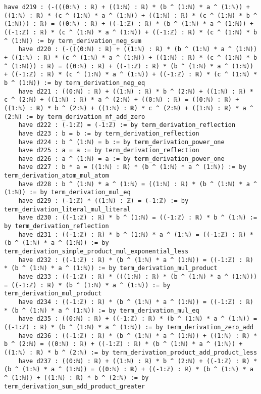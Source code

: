 \documentclass{article}
\begin{document}
\begin{tcolorbox}[colback=white!10, width=\linewidth]
\begin{lstlisting}[language=Lean4]
    have d219 : (-(((0:ℕ) : ℝ) + ((1:ℕ) : ℝ) * (b ^ (1:ℕ) * a ^ (1:ℕ)) + ((1:ℕ) : ℝ) * (c ^ (1:ℕ) * a ^ (1:ℕ)) + ((1:ℕ) : ℝ) * (c ^ (1:ℕ) * b ^ (1:ℕ))) : ℝ) = ((0:ℕ) : ℝ) + ((-1:ℤ) : ℝ) * (b ^ (1:ℕ) * a ^ (1:ℕ)) + ((-1:ℤ) : ℝ) * (c ^ (1:ℕ) * a ^ (1:ℕ)) + ((-1:ℤ) : ℝ) * (c ^ (1:ℕ) * b ^ (1:ℕ)) := by term_derivation_neg_sum
    have d220 : (-(((0:ℕ) : ℝ) + ((1:ℕ) : ℝ) * (b ^ (1:ℕ) * a ^ (1:ℕ)) + ((1:ℕ) : ℝ) * (c ^ (1:ℕ) * a ^ (1:ℕ)) + ((1:ℕ) : ℝ) * (c ^ (1:ℕ) * b ^ (1:ℕ))) : ℝ) = ((0:ℕ) : ℝ) + ((-1:ℤ) : ℝ) * (b ^ (1:ℕ) * a ^ (1:ℕ)) + ((-1:ℤ) : ℝ) * (c ^ (1:ℕ) * a ^ (1:ℕ)) + ((-1:ℤ) : ℝ) * (c ^ (1:ℕ) * b ^ (1:ℕ)) := by term_derivation_neg_eq
    have d221 : ((0:ℕ) : ℝ) + ((1:ℕ) : ℝ) * b ^ (2:ℕ) + ((1:ℕ) : ℝ) * c ^ (2:ℕ) + ((1:ℕ) : ℝ) * a ^ (2:ℕ) + ((0:ℕ) : ℝ) = ((0:ℕ) : ℝ) + ((1:ℕ) : ℝ) * b ^ (2:ℕ) + ((1:ℕ) : ℝ) * c ^ (2:ℕ) + ((1:ℕ) : ℝ) * a ^ (2:ℕ) := by term_derivation_nf_add_zero
    have d222 : (-1:ℤ) = (-1:ℤ) := by term_derivation_reflection
    have d223 : b = b := by term_derivation_reflection
    have d224 : b ^ (1:ℕ) = b := by term_derivation_power_one
    have d225 : a = a := by term_derivation_reflection
    have d226 : a ^ (1:ℕ) = a := by term_derivation_power_one
    have d227 : b * a = ((1:ℕ) : ℝ) * (b ^ (1:ℕ) * a ^ (1:ℕ)) := by term_derivation_atom_mul_atom
    have d228 : b ^ (1:ℕ) * a ^ (1:ℕ) = ((1:ℕ) : ℝ) * (b ^ (1:ℕ) * a ^ (1:ℕ)) := by term_derivation_mul_eq
    have d229 : (-1:ℤ) * ((1:ℕ) : ℤ) = (-1:ℤ) := by term_derivation_literal_mul_literal
    have d230 : ((-1:ℤ) : ℝ) * b ^ (1:ℕ) = ((-1:ℤ) : ℝ) * b ^ (1:ℕ) := by term_derivation_reflection
    have d231 : ((-1:ℤ) : ℝ) * b ^ (1:ℕ) * a ^ (1:ℕ) = ((-1:ℤ) : ℝ) * (b ^ (1:ℕ) * a ^ (1:ℕ)) := by term_derivation_simple_product_mul_exponential_less
    have d232 : ((-1:ℤ) : ℝ) * (b ^ (1:ℕ) * a ^ (1:ℕ)) = ((-1:ℤ) : ℝ) * (b ^ (1:ℕ) * a ^ (1:ℕ)) := by term_derivation_mul_product
    have d233 : ((-1:ℤ) : ℝ) * (((1:ℕ) : ℝ) * (b ^ (1:ℕ) * a ^ (1:ℕ))) = ((-1:ℤ) : ℝ) * (b ^ (1:ℕ) * a ^ (1:ℕ)) := by term_derivation_mul_product
    have d234 : ((-1:ℤ) : ℝ) * (b ^ (1:ℕ) * a ^ (1:ℕ)) = ((-1:ℤ) : ℝ) * (b ^ (1:ℕ) * a ^ (1:ℕ)) := by term_derivation_mul_eq
    have d235 : ((0:ℕ) : ℝ) + ((-1:ℤ) : ℝ) * (b ^ (1:ℕ) * a ^ (1:ℕ)) = ((-1:ℤ) : ℝ) * (b ^ (1:ℕ) * a ^ (1:ℕ)) := by term_derivation_zero_add
    have d236 : ((-1:ℤ) : ℝ) * (b ^ (1:ℕ) * a ^ (1:ℕ)) + ((1:ℕ) : ℝ) * b ^ (2:ℕ) = ((0:ℕ) : ℝ) + ((-1:ℤ) : ℝ) * (b ^ (1:ℕ) * a ^ (1:ℕ)) + ((1:ℕ) : ℝ) * b ^ (2:ℕ) := by term_derivation_product_add_product_less
    have d237 : ((0:ℕ) : ℝ) + ((1:ℕ) : ℝ) * b ^ (2:ℕ) + ((-1:ℤ) : ℝ) * (b ^ (1:ℕ) * a ^ (1:ℕ)) = ((0:ℕ) : ℝ) + ((-1:ℤ) : ℝ) * (b ^ (1:ℕ) * a ^ (1:ℕ)) + ((1:ℕ) : ℝ) * b ^ (2:ℕ) := by term_derivation_sum_add_product_greater

\end{lstlisting}
\end{tcolorbox}
\end{document}
